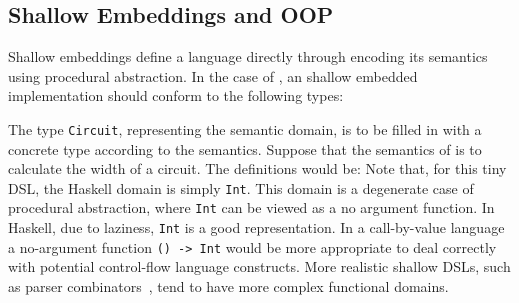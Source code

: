 \subsection{Shallow Embeddings and OOP}\label{subsec:shallow}
Shallow embeddings define a language directly through encoding its semantics
using procedural abstraction. In the case of \dsl,
an shallow embedded implementation should conform to the following
types:

The type \lstinline{Circuit}, representing the semantic domain, is to be filled in with a concrete type according to the semantics.
Suppose that the semantics of \dsl is to calculate the width of a
circuit. The definitions would be:
Note that, for this tiny DSL, the Haskell domain is simply
\lstinline{Int}. This domain is a degenerate case of
procedural abstraction, where \lstinline{Int} can be viewed 
as a no argument function. In Haskell, due to laziness, \lstinline{Int}
is a good representation. In a call-by-value language 
a no-argument function \lstinline{() -> Int} would be more
appropriate to deal correctly with potential control-flow 
language constructs. More realistic shallow DSLs, such as parser 
combinators~\cite{leijen01parsec}, tend to have more complex functional domains.

\begin{comment}

A simple rewriting of the previous program is to wrap the result into an
datatype, getting back the value through pattern matching:

\end{comment}

